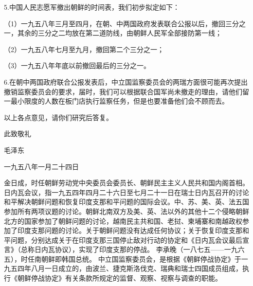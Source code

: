 5.中国人民志愿军撤出朝鲜的时间表，我们初步拟定如下：

（1）一九五八年三月至四月，在朝、中两国政府发表联合公报以后，撤回三分之一，其余的三分之二均放在第二道防线，由朝鲜人民军全部接防第一线；

（2）一九五八年七月至九月，撤回第二个三分之一；

（3）一九五八年年底以前撤回最后的三分之一。

6.在朝中两国政府联合公报发表后，中立国监察委员会的两瑞方面很可能再次提出撤销监察委员会的要求，届时，我们可以根据联合国军尚未撤走的理由，请他们留一最小限度的人数在板门店执行监察任务，但是也要准备他们会不顾而去。

以上各点意见，请你们研究后答复。

此致敬礼

毛泽东

一九五八年一月二十四日

\begin{maonote}
金日成，时任朝鲜劳动党中央委员会委员长、朝鲜民主主义人民共和国内阁首相。
日内瓦会议，指一九五四年四月二十六日至七月二十一日在瑞士日内瓦召开的讨论和平解决朝鲜问题和恢复印度支那和平问题的国际会议。中、苏、美、英、法五国参加所有两项议题的讨论。朝鲜北南双方及美、英、法以外的其他十二个侵略朝鲜北方的国家参加了朝鲜问题的讨论，越南民主共和国、老挝、柬埔寨和南越政权参加了印度支那问题的讨论。关于朝鲜问题没有达成任何协议；关于恢复印度支那和平问题，分别达成关于在印度支那三国停止敌对行动的协定和《日内瓦会议最后宣言》（总称日内瓦协议），实现了印度支那的停战。
李承晚（一八七五——一九六五），时任南朝鲜即韩国总统。
中立国监察委员会，是根据《朝鲜停战协定》于一九五四年八月一日成立的，由波兰、捷克斯洛伐克、瑞典和瑞士四国成员组成，执行《朝鲜停战协定》有关条款所规定的监督、观察、视察与调查的职能。
\end{maonote}
